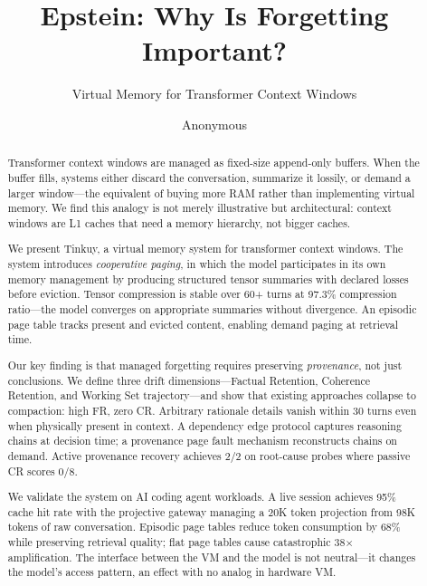 \documentclass[sigplan,screen,anonymous]{acmart}
\begin{document}
\title{Epstein: Why Is Forgetting Important?}
\subtitle{Virtual Memory for Transformer Context Windows}

\author{Anonymous}

\begin{abstract}
Transformer context windows are managed as fixed-size append-only
buffers. When the buffer fills, systems either discard the
conversation, summarize it lossily, or demand a larger window---the
equivalent of buying more RAM rather than implementing virtual memory.
We find this analogy is not merely illustrative but architectural:
context windows are L1 caches that need a memory hierarchy, not bigger
caches.

We present Tinkuy, a virtual memory system for transformer context
windows. The system introduces \emph{cooperative paging}, in which the
model participates in its own memory management by producing structured
tensor summaries with declared losses before eviction. Tensor
compression is stable over 60+ turns at 97.3\% compression ratio---the
model converges on appropriate summaries without divergence. An
episodic page table tracks present and evicted content, enabling
demand paging at retrieval time.

Our key finding is that managed forgetting requires preserving
\emph{provenance}, not just conclusions. We define three drift
dimensions---Factual Retention, Coherence Retention, and Working Set
trajectory---and show that existing approaches collapse to compaction:
high FR, zero CR. Arbitrary rationale details vanish within 30 turns
even when physically present in context. A dependency edge protocol
captures reasoning chains at decision time; a provenance page fault
mechanism reconstructs chains on demand. Active provenance recovery
achieves 2/2 on root-cause probes where passive CR scores 0/8.

We validate the system on AI coding agent workloads. A live session
achieves 95\% cache hit rate with the projective gateway managing a
20K token projection from 98K tokens of raw conversation. Episodic
page tables reduce token consumption by 68\% while preserving
retrieval quality; flat page tables cause catastrophic 38$\times$
amplification. The interface between the VM and the model is not
neutral---it changes the model's access pattern, an effect with no
analog in hardware VM.
\end{abstract}

\maketitle
\end{document}
